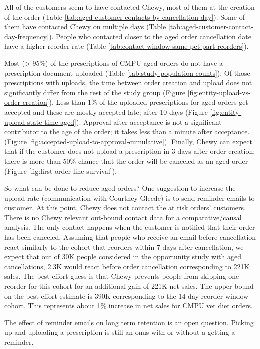 \documentclass[
  10pt,
]{article}
\begin{document}
All of the customers seem to have contacted Chewy, most of them at the
creation of the order (Table
\ref{tab:aged-customer-contacts-by-cancellation-day}). Some of them
have contacted Chewy on multiple days (Table
\ref{tab:aged-customer-contact-day-frequency}). People who
contacted closer to the aged order cancellation date have a higher
reorder rate (Table \ref{tab:contact-window-same-pet-part-reorders}).

Most (> 95\%) of the prescriptions of CMPU aged orders do not have a
prescription document uploaded (Table \ref{tab:study-population-counts}).  Of those prescriptions with uploads, the time between order creation and upload does not significantly differ from the rest of the study group
(Figure \ref{fig:entity-upload-vs-order-creation}). Less than 1\% of the uploaded prescriptions for aged orders get accepted and these are mostly accepted late; after 10 days (Figure \ref{fig:entity-upload-state-time-aged}). Approval after acceptance is not a significant contributor to the age of the order; it takes less than a minute after acceptance. (Figure \ref{fig:accepted-upload-to-approval-cumulative}). Finally, Chewy can expect that if the customer does not upload a prescription in 3 days after order creation; there is more than 50\% chance that the order will be canceled as an aged order (Figure \ref{fig:first-order-line-survival}).

So what can be done to reduce aged orders?  One suggestion to increase
the upload rate (communication with Courtney Gleede) is to send
reminder emails to customer. At this point, Chewy does not contact the
at risk orders' customers. There is no Chewy relevant out-bound
contact data for a comparative/causal analysis. The only contact
happens when the customer is notified that their order has been
canceled.  Assuming that people who receive an email before
cancellation react similarly to the cohort that reorders within 7 days
after cancellation, we expect that out of 30K people considered in the
opportunity study with aged cancellations, 2.3K would react before
order cancellation corresponding to 221K sales. The best effort guess
is that Chewy prevents people from skipping one reorder for this
cohort for an additional gain of 221K net sales.  The upper bound on
the best effort estimate is 390K corresponding to the 14 day reorder
window cohort. This represents about 1\% increase in net sales for
CMPU vet diet orders.

The effect of reminder emails on long term retention is an open
question. Picking up and uploading a prescription is
still an onus with or without a getting a reminder.
\end{document}
